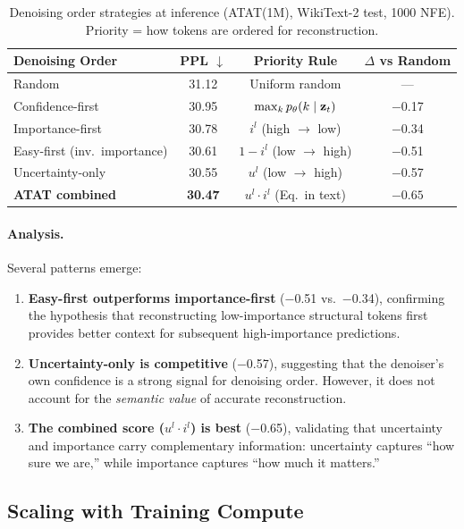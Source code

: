 \begin{table}[h]
\centering
\caption{Denoising order strategies at inference (ATAT(1M), WikiText-2 test, 1000 NFE). Priority = how tokens are ordered for reconstruction.}
\label{tab:denoising-strategies}
\begin{tabular}{lccc}
\toprule
\textbf{Denoising Order} & \textbf{PPL} $\downarrow$ & \textbf{Priority Rule} & \textbf{$\Delta$ vs Random} \\
\midrule
Random & 31.12 & Uniform random & --- \\
Confidence-first & 30.95 & $\max_k p_\theta(k \mid \mathbf{z}_t)$ & $-$0.17 \\
Importance-first & 30.78 & $i^l$ (high $\to$ low) & $-$0.34 \\
Easy-first (inv.\ importance) & 30.61 & $1 - i^l$ (low $\to$ high) & $-$0.51 \\
Uncertainty-only & 30.55 & $u^l$ (low $\to$ high) & $-$0.57 \\
\textbf{ATAT combined} & \textbf{30.47} & $u^l \cdot i^l$ (Eq.\ in text) & $\mathbf{-0.65}$ \\
\bottomrule
\end{tabular}
\end{table}

\paragraph{Analysis.} Several patterns emerge:
\begin{enumerate}[leftmargin=*,itemsep=1pt]
    \item \textbf{Easy-first outperforms importance-first} ($-$0.51 vs.\ $-$0.34), confirming the hypothesis that reconstructing low-importance structural tokens first provides better context for subsequent high-importance predictions.
    \item \textbf{Uncertainty-only is competitive} ($-$0.57), suggesting that the denoiser's own confidence is a strong signal for denoising order. However, it does not account for the \emph{semantic value} of accurate reconstruction.
    \item \textbf{The combined score ($u^l \cdot i^l$) is best} ($-$0.65), validating that uncertainty and importance carry complementary information: uncertainty captures ``how sure we are,'' while importance captures ``how much it matters.''
\end{enumerate}

\subsection{Scaling with Training Compute}

